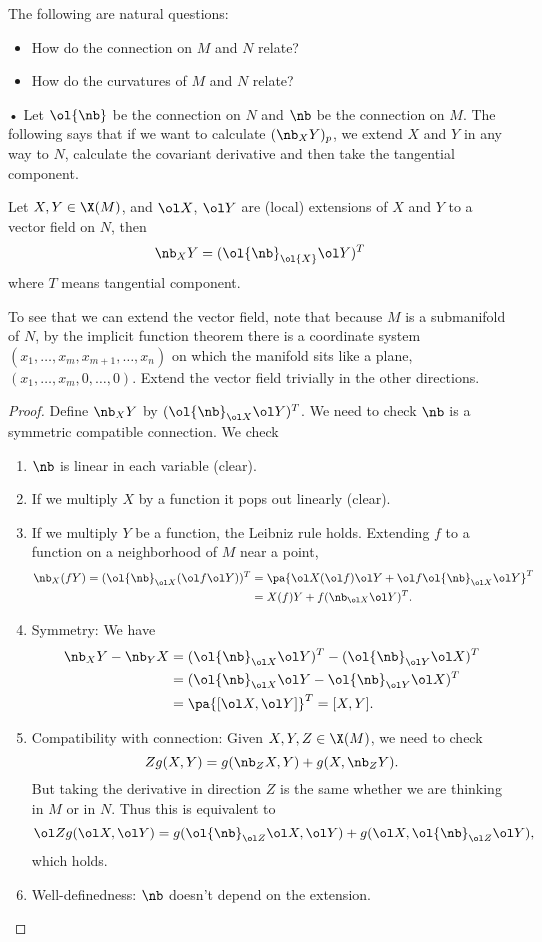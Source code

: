 The following are natural questions:
\begin{itemize}
\item
How do the connection on $M$ and $N$ relate?
\item
How do the curvatures of $M$ and $N$ relate?
\end{itemize}•
Let $\ol{\nb}$ be the connection on $N$ and $\nb$ be the connection on $M$. The following says that if we want to calculate $(\nb_XY)_p$, we extend $X$ and $Y$ in any way to $N$, calculate the covariant derivative and then take the tangential component.

\begin{pr}
Let $X,Y\in \X(M)$, and $\ol X$, $\ol Y$ are (local) extensions of $X$ and $Y$ to a vector field on $N$, then
\[
\nb_XY=(\ol{\nb}_{\ol{X}}\ol Y)^T
\]
where $T$ means tangential component.
\end{pr}
To see that we can extend the vector field, note that because $M$ is a submanifold of $N$, by the implicit function theorem there is a coordinate system $(x_1,\ldots, x_m,x_{m+1},\ldots, x_n)$ on which the manifold sits like a plane, $(x_1,\ldots, x_m,0,\ldots, 0)$. Extend the vector field trivially in the other directions.
\begin{proof}
Define ${\nb}_XY$ by $(\ol{\nb}_{\ol X}\ol Y)^T$. 
We need to check $\nb$ is a symmetric compatible connection. %
We check
\begin{enumerate}
\item
$\nb$ is linear in each variable (clear).
\item
If we multiply $X$ by a function it pops out linearly (clear). %
\item
If we multiply $Y$ be a function, the Leibniz rule holds. Extending $f$ to a function on a neighborhood of $M$ near a point, 
\begin{align*}
\nb_X(fY)=(\ol{\nb}_{\ol X} (\ol f \ol Y))^T&=\pa{\ol X(\ol f)\ol Y+ \ol f\ol{\nb}_{\ol X} \ol Y}^T\\
&=X(f)Y+f(\nb_{\ol X} \ol Y)^T.
\end{align*}
\item
Symmetry: We have
\begin{align*}
\nb_XY-\nb_YX&=(\ol{\nb}_{\ol X} \ol Y)^T-(\ol{\nb}_{\ol Y} \ol X)^T\\
&=(\ol{\nb}_{\ol X} \ol Y-\ol{\nb}_{\ol Y} \ol X)^T \\
&=\pa{[\ol X,\ol Y]}^T=[X,Y].
\end{align*}
\item
Compatibility with connection: Given $X,Y,Z\in \X(M)$, we need to check
\[
Zg(X,Y)=g(\nb_ZX,Y)+g(X,\nb_ZY).
\]
But taking the derivative in direction $Z$ is the same whether we are thinking in $M$ or in $N$. Thus this is equivalent to
\[
\ol Zg(\ol X,\ol Y)=g(\ol{\nb}_{\ol Z}\ol X,\ol Y)+g(\ol X,{\ol{\nb}}_{\ol Z}\ol Y),
\]
which holds.
\item Well-definedness: $\nb$ doesn't depend on the extension.
\end{enumerate}
\end{proof}

